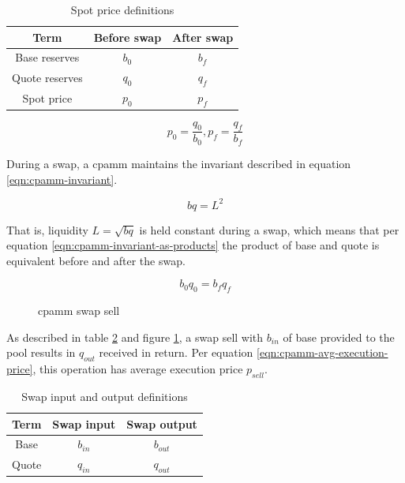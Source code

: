 \documentclass[table, twocolumn]{article}
\begin{document}
\begin{table}[!htb]
  \centering
  \begin{tabular}{|c|c|c|}
    \hline \rowcolor{blue}
    Term           & Before swap & After swap \\ \hline
    Base reserves  & $b_0$       & $b_f$      \\ \hline
    Quote reserves & $q_0$       & $q_f$      \\ \hline
    Spot price     & $p_0$       & $p_f$      \\ \hline
  \end{tabular}
  \caption{Spot price definitions}
  \label{tab:spot-before-after-swap}
\end{table}

\begin{equation} \label{eqn:price-before-after}
  p_0 = \frac{q_0}{b_0},
  p_f = \frac{q_f}{b_f}
\end{equation}

During a swap, a \gls{cpamm} maintains the invariant described in equation
\ref{eqn:cpamm-invariant}.

\begin{equation} \label{eqn:cpamm-invariant}
  b q = L^2
\end{equation}

That is, liquidity $L = \sqrt{bq}$ is held constant during a swap, which means that per
equation \ref{eqn:cpamm-invariant-as-products} the product of base and quote is
equivalent before and after the swap.

\begin{equation} \label{eqn:cpamm-invariant-as-products}
  b_0 q_0 = b_f q_f
\end{equation}

\begin{figure}[!htb]
  \centering
  
  \caption{\gls{cpamm} swap sell}
  \label{fig:cpamm-swap-sell}
\end{figure}

As described in table \ref{tab:swap-in-out} and figure \ref{fig:cpamm-swap-sell}, a swap
sell with $b_{in}$ of base provided to the pool results in $q_{out}$ received in return.
Per equation \ref{eqn:cpamm-avg-execution-price}, this operation has average execution
price $p_{sell}$.

\begin{table}[!htb]
  \centering
  \begin{tabular}{|c|c|c|}
    \hline \rowcolor{blue}
    Term  & Swap input & Swap output \\ \hline
    Base  & $b_{in}$   & $b_{out}$   \\ \hline
    Quote & $q_{in}$   & $q_{out}$   \\ \hline
  \end{tabular}
  \caption{Swap input and output definitions}
  \label{tab:swap-in-out}
\end{table}
\end{document}
